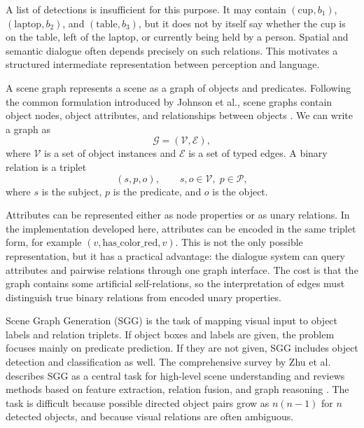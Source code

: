 A list of detections is insufficient for this purpose. It may contain \((\text{cup}, b_1)\), \((\text{laptop}, b_2)\), and \((\text{table}, b_3)\), but it does not by itself say whether the cup is on the table, left of the laptop, or currently being held by a person. Spatial and semantic dialogue often depends precisely on such relations. This motivates a structured intermediate representation between perception and language.

A scene graph represents a scene as a graph of objects and predicates. Following the common formulation introduced by Johnson et al., scene graphs contain object nodes, object attributes, and relationships between objects \cite[3668--3669]{johnson_image_2015}. We can write a graph as
\[
\mathcal{G}=(\mathcal{V},\mathcal{E}),
\]
where \(\mathcal{V}\) is a set of object instances and \(\mathcal{E}\) is a set of typed edges. A binary relation is a triplet
\[
(s,p,o),\qquad s,o\in\mathcal{V},\; p\in\mathcal{P},
\]
where \(s\) is the subject, \(p\) is the predicate, and \(o\) is the object.

Attributes can be represented either as node properties or as unary relations. In the implementation developed here, attributes can be encoded in the same triplet form, for example \((v,\text{has\_color\_red},v)\). This is not the only possible representation, but it has a practical advantage: the dialogue system can query attributes and pairwise relations through one graph interface. The cost is that the graph contains some artificial self-relations, so the interpretation of edges must distinguish true binary relations from encoded unary properties.

Scene Graph Generation (SGG) is the task of mapping visual input to object labels and relation triplets. If object boxes and labels are given, the problem focuses mainly on predicate prediction. If they are not given, SGG includes object detection and classification as well. The comprehensive survey by Zhu et al. describes SGG as a central task for high-level scene understanding and reviews methods based on feature extraction, relation fusion, and graph reasoning \cite{zhu_scene_2022}. The task is difficult because possible directed object pairs grow as \(n(n-1)\) for \(n\) detected objects, and because visual relations are often ambiguous.

